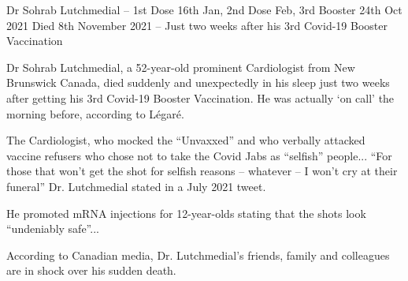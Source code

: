 Dr Sohrab Lutchmedial – 1st Dose 16th Jan, 2nd Dose Feb, 3rd Booster 24th Oct
2021 Died 8th November 2021 – Just two weeks after his 3rd Covid-19 Booster
Vaccination

Dr Sohrab Lutchmedial, a 52-year-old prominent Cardiologist from New Brunswick
Canada, died suddenly and unexpectedly in his sleep just two weeks after getting
his 3rd Covid-19 Booster Vaccination. He was actually ‘on call’ the morning
before, according to Légaré.

The Cardiologist, who mocked the “Unvaxxed” and who verbally attacked vaccine
refusers who chose not to take the Covid Jabs as “selfish” people... “For those
that won’t get the shot for selfish reasons – whatever – I won’t cry at their
funeral” Dr. Lutchmedial stated in a July 2021 tweet.

He promoted mRNA injections for 12-year-olds stating that the shots look
“undeniably safe”...

According to Canadian media, Dr. Lutchmedial’s friends, family and colleagues
are in shock over his sudden death.
